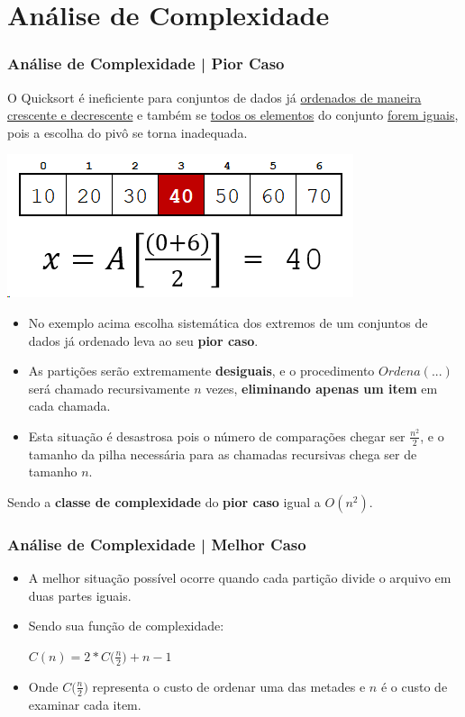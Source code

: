 \documentclass[
	11pt, %
]{beamer}
\begin{document}
\section{Análise de Complexidade} 
\begin{frame}
	\frametitle{Análise de Complexidade | Pior Caso}
	{\tiny \justifying
	O Quicksort é ineficiente para conjuntos de dados já \underline{ordenados de maneira crescente e decrescente} e também se \underline{todos os elementos} do conjunto \underline{forem iguais}, pois a escolha do pivô se torna inadequada.}
	
	\begin{center}
		\includegraphics[width=0.5\linewidth]{exemplo1}
	\end{center}
	{\tiny
	\begin{itemize}
		\item \justifying No exemplo acima escolha sistemática dos extremos de um conjuntos de dados já ordenado leva ao seu \textbf{pior caso}.
	
		\item \justifying As partições serão extremamente \textbf{desiguais}, e o procedimento $Ordena(...)$ será chamado recursivamente $n$ vezes, \textbf{eliminando apenas um item} em cada chamada.
		
		\item \justifying Esta situação é desastrosa pois o número de comparações chegar ser $\frac{n^{2}}{2}$, e o tamanho da pilha necessária para as chamadas recursivas chega ser de tamanho $n$.
	\end{itemize}
	}

	\begin{center}
		Sendo a \textbf{classe de complexidade} do \textbf{pior caso} igual a $O(n^{2})$.
	\end{center}
\end{frame}

\begin{frame}
	\frametitle{Análise de Complexidade | Melhor Caso}
	
	{\small
	\begin{itemize}
		\item A melhor situação possível ocorre quando cada partição divide o arquivo em duas partes iguais.
		\item Sendo sua função de complexidade:
		
		\begin{center}
			$C(n) = 2*C\bigg(\frac{n}{2}\bigg) + n - 1$
		\end{center}
		
		\item Onde $C\bigg(\frac{n}{2}\bigg)$ representa o custo de ordenar uma das metades e $n$ é o custo de examinar cada item.
	\end{itemize}
	}
\end{frame}
\end{document}
